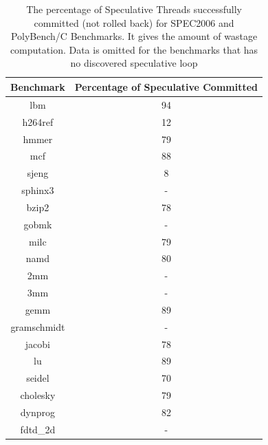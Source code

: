 \documentclass[10pt]{report}          %
\begin{document}
\begin{table}
\centering
\caption{The percentage of Speculative Threads successfully committed (not rolled back) for SPEC2006 and PolyBench/C Benchmarks.  It gives the amount of wastage computation. Data is omitted for the benchmarks that has no discovered speculative loop }
\begin{tabular}{|c||c|} \hline
Benchmark &Percentage of Speculative Committed\\ \hline 
lbm &  94\\ \hline
h264ref & 12  \\ \hline
hmmer &	79	  \\ \hline
mcf & 88 \\ \hline
sjeng &	8 \\ \hline
sphinx3 & -  \\ \hline
bzip2 & 78  \\ \hline
gobmk & -  \\ \hline
milc & 79  \\ \hline
namd & 80  \\ \hline
2mm	& - \\ \hline
3mm	& - \\ \hline
gemm	 & 89 \\ \hline
gramschmidt	& - \\ \hline
jacobi & 78 \\ \hline
lu	& 89 \\ \hline
seidel&	70 \\ \hline
cholesky & 79 \\ \hline
dynprog & 82 \\ \hline
fdtd\_2d & - \\ \hline
\hline\end{tabular}
\label{table:spec_committed}
\end{table}
\end{document}
